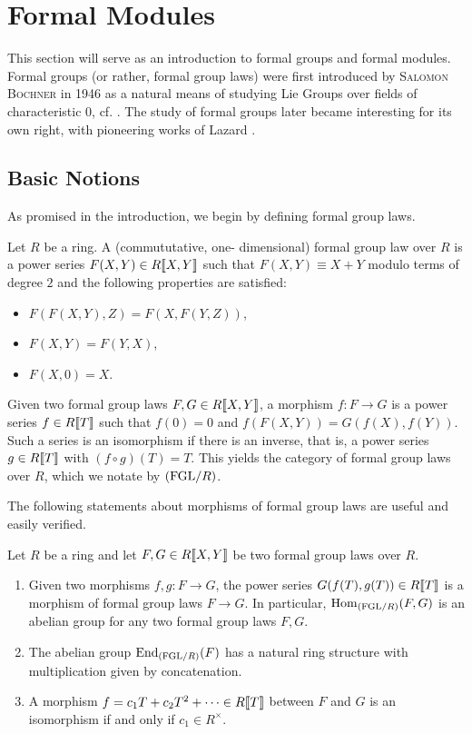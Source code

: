 \documentclass[../main.tex]{subfiles}
\begin{document}
\section{Formal Modules}
This section will serve as an introduction to formal groups and 
formal modules. Formal groups (or rather, formal group laws) were first
introduced by \textsc{Salomon Bochner} in 1946 as a natural means of studying Lie
Groups over fields of characteristic $0$, cf. \cite{Bochner1946FGrps}. 
The study of formal groups later became interesting for its own right, 
with pioneering works of Lazard \cite{Lazard1955FGrps}. 

\subsection{Basic Notions} %
\label{sub:Basic Notions}
As promised in the introduction, we begin by defining {formal group
laws}.

\begin{defi}
    Let $R$ be a ring. A (commututative, one-\allowbreak
    dimen\-sional) formal group law over $R$ is a power series $F(X,Y) \in
    R\llbracket X, Y \rrbracket$ such that $F(X,Y) \equiv X + Y$ modulo terms
    of degree $2$ and
    the following properties are satisfied:
    \begin{itemize}
        \item $F(F(X,Y),Z) = F(X,F(Y,Z))$,
        \item $F(X,Y) = F(Y,X)$,
        \item $F(X,0) = X$.
    \end{itemize}
\end{defi}

Given two formal group laws $F, G \in R\llbracket X,Y\rrbracket$, a morphism
$f: F\to G$ is a 
power series $f \in R\llbracket T \rrbracket$ such that $f(0) = 0$ and $f(F(X,Y)) =
G(f(X),f(Y))$.
Such a series is an isomorphism if there is an {inverse}, that
is, a power series $g \in R\llbracket T \rrbracket$ with $(f \circ g)(T) = T$.
This yields the category of formal group laws over $R$, which we notate by
${(\mathrm{FGL}/{R})}$.

The following statements about morphisms of formal group laws are 
useful and easily verified.
\begin{lem}\label{lem:FGLeasyfacts}
  Let $R$ be a ring and let $F,G \in R\llbracket X,Y\rrbracket$ be two formal
  group laws over $R$. 
  \begin{enumerate}
    \item Given two morphisms $f,g : F \to G$, the power series $G(f(T), g(T))
      \in R\llbracket T \rrbracket$ is a morphism of formal group laws 
      $F \to G$. In particular, $\operatorname{Hom}_{(\mathrm{FGL}/{R})}(F,G)$ is an abelian
      group for any two formal group laws $F,G$.
    \item The abelian group $\operatorname{End}_{(\mathrm{FGL}/{R})}(F)$ has a natural ring structure
      with multiplication given by concatenation.
    \item A morphism $f = c_1 T + c_2 T^2 + \dots \in R\llbracket T \rrbracket$ between
      $F$ and $G$ is an isomorphism if and only if $c_1 \in R^\times$.
  \end{enumerate}
\end{lem}
\end{document}
